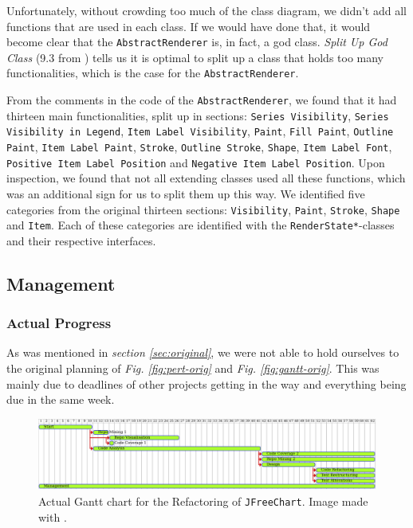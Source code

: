 \documentclass[11pt]{article}
\begin{document}
	Unfortunately, without crowding too much of the class diagram, we didn't add all functions that are used in each class. If we would have done that, it would become clear that the \texttt{AbstractRenderer} is, in fact, a god class. \textsl{Split Up God Class} (9.3 from \cite{demeyer2009object}) tells us it is optimal to split up a class that holds too many functionalities, which is the case for the \texttt{AbstractRenderer}.
	
	From the comments in the code of the \texttt{AbstractRenderer}, we found that it had thirteen main functionalities, split up in sections: \texttt{Series Visibility}, \texttt{Series Visibility in Legend}, \texttt{Item Label Visibility}, \texttt{Paint}, \texttt{Fill Paint}, \texttt{Outline Paint}, \texttt{Item Label Paint}, \texttt{Stroke}, \texttt{Outline Stroke}, \texttt{Shape}, \texttt{Item Label Font}, \texttt{Positive Item Label Position} and \texttt{Negative Item Label Position}. Upon inspection, we found that not all extending classes used all these functions, which was an additional sign for us to split them up this way. We identified five categories from the original thirteen sections: \texttt{Visibility}, \texttt{Paint}, \texttt{Stroke}, \texttt{Shape} and \texttt{Item}. Each of these categories are identified with the \texttt{RenderState*}-classes and their respective interfaces.
	
	\subsection{Management}
	\label{sec:management2}
	\subsubsection{Actual Progress}
	As was mentioned in \textsl{section \ref{sec:original}}, we were not able to hold ourselves to the original planning of \textsl{Fig. \ref{fig:pert-orig}} and \textsl{Fig. \ref{fig:gantt-orig}}. This was mainly due to deadlines of other projects getting in the way and everything being due in the same week.
	
	\begin{figure}[H] 
		\centering 
		\includegraphics[width=\textwidth]{pictures/gantt-actual.pdf}
		\caption{Actual \textsf{Gantt} chart for the Refactoring of \texttt{JFreeChart}. Image made with \cite{plantuml}.} 
		\label{fig:gantt-actual} 
	\end{figure}
\end{document}
